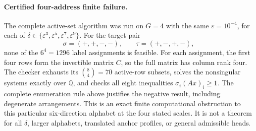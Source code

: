 \paragraph{Certified four-address finite failure.}
The complete active-set algorithm was run on $G=4$ with the same
 $\varepsilon=10^{-4}$, for each of
 $\delta\in\{\varepsilon^3,\varepsilon^5,\varepsilon^7,\varepsilon^9\}$.
For the target pair
\[
 \sigma=(+,+,-,-),\qquad \tau=(+,-,+,-),
\]
none of the $6^4=1296$ label assignments is feasible.  For each assignment,
 the first four rows form the invertible matrix $C$, so the full matrix
 has column rank four.  The checker exhausts its $\binom84=70$ active-row
 subsets, solves the nonsingular systems exactly over $\mathbb Q$, and
 checks all eight inequalities $\sigma_i(Ax)_i\geq1$.  The complete
 enumeration rule above justifies the negative result, including
 degenerate arrangements.  This is an exact finite computational
 obstruction to this particular six-direction alphabet at the four stated
 scales.  It is not a theorem for all $\delta$, larger alphabets, translated
 anchor profiles, or general admissible heads.

